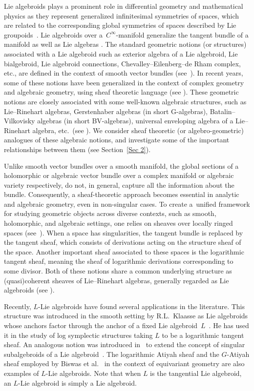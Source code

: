 \documentclass[pdftex]{sigma}
\numberwithin{equation}{section}
\theoremstyle{definition}
\begin{document}
Lie algebroids plays a prominent role in differential geometry and mathematical physics as they represent generalized infinitesimal symmetries of spaces, which are related to the corresponding global symmetries of spaces described by Lie groupoids~\cite{KM}.
Lie algebroids over a~$C^{\infty}$\nobreakdash-manifold generalize the tangent bundle of a manifold as well as Lie algebras \cite{AW-EL, MM}.
The standard geometric notions (or structures) associated with a Lie algebroid such as exterior algebra of a Lie algebroid, Lie bialgebroid, Lie algebroid connections, Chevalley--Eilenberg--de Rham complex, etc., are defined in the context of smooth vector bundles (see~\cite{KM, PX}). In recent years, some of these notions have been generalized in the context of complex geometry and algebraic geometry, using sheaf theoretic language (see \cite{UB,BRT,DRV, CV,MK, AA, BP, PT}). These geometric notions are closely associated with some well-known algebraic structures, such as Lie--Rinehart algebras, Gerstenhaber algebras (in short G-algebras), Batalin--Vilkovisky algebras (in short BV-algebras), universal enveloping algebra of a Lie--Rinehart algebra, etc.\ (see \cite{JH, JH2,KS, MM, LM, PX}).
We consider sheaf theoretic (or algebro-geometric) analogues of these algebraic notions, and investigate some of the important relationships between them (see Section~\ref{Sec 2}).

Unlike smooth vector bundles over a smooth manifold, the global sections of a holomorphic or algebraic vector bundle over a complex manifold or algebraic variety respectively, do not, in general, capture all the information about the bundle.
Consequently, a sheaf-theoretic approach becomes essential in analytic and algebraic geometry, even in non-singular cases. To create a~unified framework for studying geometric objects across diverse contexts, such as smooth, holomorphic, and algebraic settings, one relies on sheaves over locally ringed spaces (see~\cite{TS, CW}).
When a space has singularities, the tangent bundle is replaced by the tangent sheaf, which consists of derivations acting on the structure sheaf of the space. Another important sheaf associated to these spaces is the logarithmic tangent sheaf, meaning the sheaf of logarithmic derivations corresponding to some divisor. Both of these notions share a common underlying structure as (quasi)coherent sheaves of Lie--Rinehart algebras, generally regarded as Lie algebroids (see \cite{AA, BP, JV}).

Recently, $L$-Lie algebroids have found several applications in the literature. This structure was introduced in the smooth setting by R.L.~Klaasse as Lie algebroids whose anchors factor through the anchor of a fixed Lie algebroid~$L$~\cite{RK}.
 He has used it in the study of log symplectic structures taking $L$ to be a logarithmic tangent sheaf. An analogous notion was introduced in~\cite{RL25} to extend the concept of singular subalgebroids of a Lie algebroid~\cite{MZ}.
The logarithmic Atiyah sheaf and the $G$-Atiyah sheaf employed by Biswas et al.\ \cite{IBMP, IB, BKN} in the context of equivariant geometry are also examples of $L$-Lie algebroids. Note that when $L$ is the tangential Lie algebroid, an $L$-Lie algebroid is simply a Lie algebroid.
\end{document}
